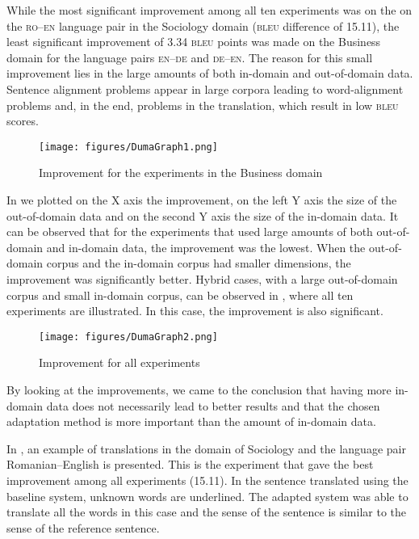 \documentclass[output=paper]{LSP/langsci}
\begin{document}
While the most significant improvement among all ten experiments was on the on the \textsc{ro--en} language pair in the Sociology domain (\textsc{bleu} difference of 15.11), the least significant improvement of 3.34 \textsc{bleu} points was made on the Business domain for the language pairs \textsc{en--de} and \textsc{de--en}. The reason for this small improvement lies in the large amounts of both in-domain and out-of-domain data. Sentence alignment problems appear in large corpora leading to word-alignment problems and, in the end, problems in the translation, which result in low \textsc{bleu} scores. 

 
\begin{figure}
\caption{Improvement for the experiments in the Business domain}
\texttt{[image: figures/DumaGraph1.png]}
\label{fig:dumavertan:3}
\end{figure}


\largerpage
In  we plotted on the X axis the improvement, on the left Y axis the size of the out-of-domain data and on the second Y axis the size of the in-domain data.  
It can be observed that for the experiments that used large amounts of both out-of-domain and in-domain data, the improvement was the lowest. When the out-of-domain corpus and the in-domain corpus had smaller dimensions, the improvement was significantly better. Hybrid cases, with a large out-of-domain corpus and small in-domain corpus, can be observed in , where all ten experiments are illustrated. In this case, the improvement is also significant. 

\begin{figure}
\caption{Improvement for all experiments}
\texttt{[image: figures/DumaGraph2.png]}
\label{fig:dumavertan:4}
\end{figure}

By looking at the improvements, we came to the conclusion that having more in-domain data does not necessarily lead to better results and that the chosen adaptation method is more important than the amount of in-domain data. 

In , an example of translations in the domain of Sociology and the language pair Romanian--English is presented. This is the experiment that gave the best improvement among all experiments (15.11). In the sentence translated using the baseline system, unknown words are underlined. The adapted system was able to translate all the words in this case and the sense of the sentence is similar to the sense of the reference sentence.
\end{document}
